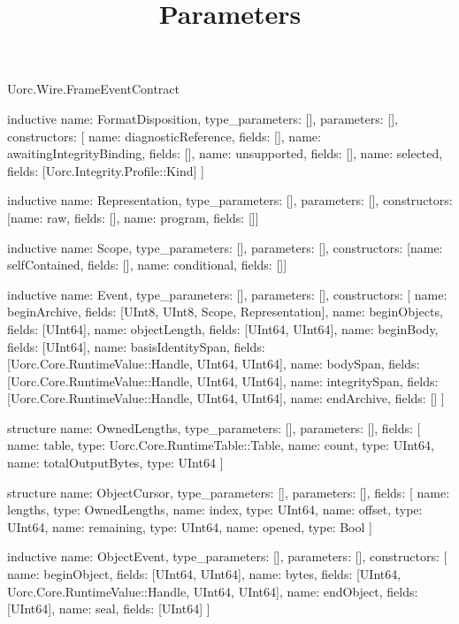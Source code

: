 \begin{lexlean}{Uorc.Wire.FrameEventContract}
\title{Parameters}
\begin{semanticmodule}
inductive{
  name: FormatDisposition,
  type_parameters: [],
  parameters: [],
  constructors: [
    {name: diagnosticReference, fields: []},
    {name: awaitingIntegrityBinding, fields: []},
    {name: unsupported, fields: []},
    {name: selected, fields: [Uorc.Integrity.Profile::Kind]}
  ]
}

inductive{
  name: Representation,
  type_parameters: [],
  parameters: [],
  constructors: [{name: raw, fields: []}, {name: program, fields: []}]
}

inductive{
  name: Scope,
  type_parameters: [],
  parameters: [],
  constructors: [{name: selfContained, fields: []}, {name: conditional, fields: []}]
}

inductive{
  name: Event,
  type_parameters: [],
  parameters: [],
  constructors: [
    {name: beginArchive, fields: [UInt8, UInt8, Scope, Representation]},
    {name: beginObjects, fields: [UInt64]},
    {name: objectLength, fields: [UInt64, UInt64]},
    {name: beginBody, fields: [UInt64]},
    {name: basisIdentitySpan, fields: [Uorc.Core.RuntimeValue::Handle, UInt64, UInt64]},
    {name: bodySpan, fields: [Uorc.Core.RuntimeValue::Handle, UInt64, UInt64]},
    {name: integritySpan, fields: [Uorc.Core.RuntimeValue::Handle, UInt64, UInt64]},
    {name: endArchive, fields: []}
  ]
}

structure{
  name: OwnedLengths,
  type_parameters: [],
  parameters: [],
  fields: [
    {name: table, type: Uorc.Core.RuntimeTable::Table},
    {name: count, type: UInt64},
    {name: totalOutputBytes, type: UInt64}
  ]
}

structure{
  name: ObjectCursor,
  type_parameters: [],
  parameters: [],
  fields: [
    {name: lengths, type: OwnedLengths},
    {name: index, type: UInt64},
    {name: offset, type: UInt64},
    {name: remaining, type: UInt64},
    {name: opened, type: Bool}
  ]
}

inductive{
  name: ObjectEvent,
  type_parameters: [],
  parameters: [],
  constructors: [
    {name: beginObject, fields: [UInt64, UInt64]},
    {name: bytes, fields: [UInt64, Uorc.Core.RuntimeValue::Handle, UInt64, UInt64]},
    {name: endObject, fields: [UInt64]},
    {name: seal, fields: [UInt64]}
  ]
}


\end{semanticmodule}
\end{lexlean}
